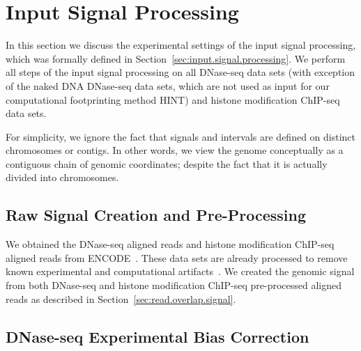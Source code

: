 \section{Input Signal Processing}
\label{sec:input.signal.processing.4}

In this section we discuss the experimental settings of the input signal processing, which was formally defined in Section~\ref{sec:input.signal.processing}. We perform all steps of the input signal processing on all DNase-seq data sets (with exception of the naked DNA DNase-seq data sets, which are not used as input for our computational footprinting method HINT) and histone modification ChIP-seq data sets.

For simplicity, we ignore the fact that signals and intervals are defined on distinct chromosomes or contigs. In other words, we view the genome conceptually as a contiguous chain of genomic coordinates; despite the fact that it is actually divided into chromosomes.

\subsection{Raw Signal Creation and Pre-Processing}
\label{sec:raw.signal.creation.preprocessing}

We obtained the DNase-seq aligned reads and histone modification ChIP-seq aligned reads from ENCODE~\cite{encode2012}. These data sets are already processed to remove known experimental and computational artifacts~\cite{encode2012,derrien2012,ashoor2013,diaz2012}. We created the genomic signal from both DNase-seq and histone modification ChIP-seq pre-processed aligned reads as described in Section~\ref{sec:read.overlap.signal}.

\subsection{DNase-seq Experimental Bias Correction}
\label{sec:dnase.experimental.bias.correction}

